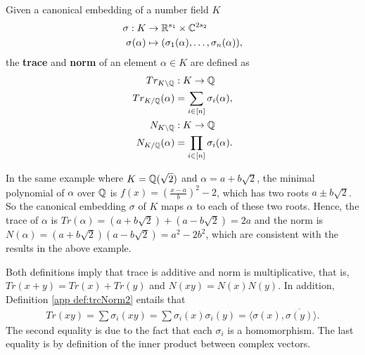 \documentclass[../main.tex]{subfiles}
\begin{document}
\begin{definition}
\label{app def:trcNorm2}
Given a canonical embedding of a number field $K$
\begin{align*}
    \sigma: K &\rightarrow \mathbb{R}^{s_1} \times \mathbb{C}^{2s_2} \\
    \sigma(\alpha) &\mapsto (\sigma_1(\alpha), \dots, \sigma_n(\alpha)),
\end{align*}
the \textbf{trace} and \textbf{norm} of an element $\alpha \in K$ are defined as 
\reversemarginpar
{}
\begin{align*}
    Tr_{K \setminus \Q}&: K \rightarrow \Q \\%
    Tr_{K/\Q}(\alpha) &= \sum_{i \in [n]} \sigma_i(\alpha), \\
    N_{K \setminus \Q}&: K \rightarrow \Q \\%
    N_{K / \Q}(\alpha) &= \prod_{i \in [n]} \sigma_i(\alpha). 
\end{align*}
\end{definition}

\begin{example}
In the same example where $K = \mathbb{Q}(\sqrt{2})$ and $\alpha = a + b\sqrt{2}$, the minimal polynomial of $\alpha$ over $\mathbb{Q}$ is $f(x) = (\frac{x-a}{b})^2 - 2$, which has two roots $ a \pm b \sqrt{2}$. So the canonical embedding $\sigma$ of $K$ maps $\alpha$ to each of these two roots. Hence, the trace of $\alpha$ is $Tr(\alpha)=(a+b\sqrt{2})+(a-b\sqrt{2}) = 2a$ and the norm is $N(\alpha)=(a+b\sqrt{2})(a-b\sqrt{2}) = a^2 - 2b^2$,  which are consistent with the results in the above example. 
\end{example}

Both definitions imply that trace is additive and norm is multiplicative, that is, $Tr(x+y) = Tr(x)+Tr(y)$ and $N(xy)=N(x)N(y)$. In addition, Definition \ref{app def:trcNorm2} entails that
\begin{align}
\label{app equ:trace}
    Tr(xy) = \sum \sigma_i(xy) = \sum \sigma_i(x) \sigma_i(y) = \langle \sigma(x), \overline{\sigma(y)} \rangle.
\end{align}
The second equality is due to the fact that each $\sigma_i$ is a homomorphism. The last equality is by definition of the inner product between complex vectors. %

\end{document}
